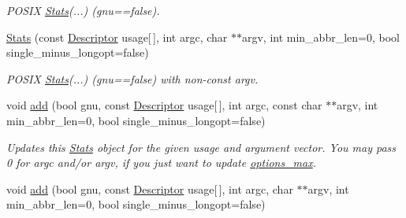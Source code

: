 \begin{DoxyCompactItemize}
\begin{DoxyCompactList}\small\item\em P\+O\+S\+I\+X \hyperlink{structxmem_1_1config_1_1third__party_1_1_stats}{Stats}(...) (gnu==false). \end{DoxyCompactList}\item 
\hypertarget{structxmem_1_1config_1_1third__party_1_1_stats_a66177fd0195cf96ed8d8020acc91ead2}{}\hyperlink{structxmem_1_1config_1_1third__party_1_1_stats_a66177fd0195cf96ed8d8020acc91ead2}{Stats} (const \hyperlink{structxmem_1_1config_1_1third__party_1_1_descriptor}{Descriptor} usage\mbox{[}$\,$\mbox{]}, int argc, char $\ast$$\ast$argv, int min\+\_\+abbr\+\_\+len=0, bool single\+\_\+minus\+\_\+longopt=false)\label{structxmem_1_1config_1_1third__party_1_1_stats_a66177fd0195cf96ed8d8020acc91ead2}

\begin{DoxyCompactList}\small\item\em P\+O\+S\+I\+X \hyperlink{structxmem_1_1config_1_1third__party_1_1_stats}{Stats}(...) (gnu==false) with non-\/const argv. \end{DoxyCompactList}\item 
void \hyperlink{structxmem_1_1config_1_1third__party_1_1_stats_a067da76c0d531c9cceb5fd1c3b8c6a2b}{add} (bool gnu, const \hyperlink{structxmem_1_1config_1_1third__party_1_1_descriptor}{Descriptor} usage\mbox{[}$\,$\mbox{]}, int argc, const char $\ast$$\ast$argv, int min\+\_\+abbr\+\_\+len=0, bool single\+\_\+minus\+\_\+longopt=false)
\begin{DoxyCompactList}\small\item\em Updates this \hyperlink{structxmem_1_1config_1_1third__party_1_1_stats}{Stats} object for the given {\ttfamily usage} and argument vector. You may pass 0 for {\ttfamily argc} and/or {\ttfamily argv}, if you just want to update \hyperlink{structxmem_1_1config_1_1third__party_1_1_stats_a74f645c06ae7eab5058f2a51226c2dcd}{options\+\_\+max}. \end{DoxyCompactList}\item 
\hypertarget{structxmem_1_1config_1_1third__party_1_1_stats_af0f264fbbf6fa2c83d56d87c501a8e89}{}void \hyperlink{structxmem_1_1config_1_1third__party_1_1_stats_af0f264fbbf6fa2c83d56d87c501a8e89}{add} (bool gnu, const \hyperlink{structxmem_1_1config_1_1third__party_1_1_descriptor}{Descriptor} usage\mbox{[}$\,$\mbox{]}, int argc, char $\ast$$\ast$argv, int min\+\_\+abbr\+\_\+len=0, bool single\+\_\+minus\+\_\+longopt=false)\label{structxmem_1_1config_1_1third__party_1_1_stats_af0f264fbbf6fa2c83d56d87c501a8e89}


\end{DoxyCompactItemize}
